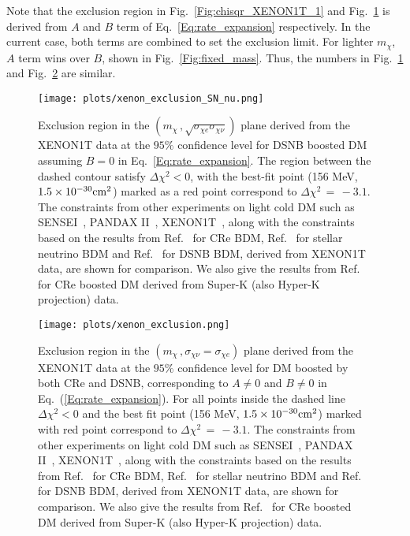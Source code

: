 \documentclass[11pt,prd,twocolumn,nofootinbib,reprint,superscriptaddress,longbibliography,colorlinks=true,citecolor=blue]{revtex4-1}
\begin{document}
Note that the exclusion region in Fig.~\ref{Fig:chisqr_XENON1T_1} and Fig.~\ref{Fig:chisqr_XENON1T_12} is derived from $A$ and $B$ term of Eq.~\ref{Eq:rate_expansion} respectively. In the current case, both terms are combined to set the exclusion limit. For lighter $m_\chi$, $A$ term wins over $B$, shown in Fig.~\ref{Fig:fixed_mass}. Thus, the numbers in Fig.~\ref{Fig:chisqr_XENON1T_12} and Fig.~\ref{Fig:chisqr_XENON1T_2} are similar.
\begin{figure}[h!]
\centering
\texttt{[image: plots/xenon\_exclusion\_SN\_nu.png]}
\caption{Exclusion region in the $(m_\chi\,,\sqrt{\sigma_{\chi e}\sigma_{\chi\nu}})$ plane derived from the XENON1T data at the $95\%$ confidence level for DSNB boosted DM assuming $B = 0$ in Eq.~\ref{Eq:rate_expansion}. The region between the dashed contour satisfy $\Delta \chi^2 < 0 $, with the best-fit point (156 MeV, $1.5\times 10^{-30} {\rm cm^2}$) marked as a red point correspond to $\Delta \chi^2\,=\, -3.1$. 
 The constraints from other experiments on light cold DM such as SENSEI~\cite{SENSEI:2020dpa}, PANDAX II~\cite{PandaX-II:2021nsg}, XENON1T~\cite{XENON:2019gfn}, along with the constraints based on the results from Ref.~\cite{Jho:2020sku} for CRe BDM, Ref.~\cite{Jho:2021rmn} for stellar neutrino BDM and Ref.~\cite{Das:2021lcr} for DSNB BDM, derived from XENON1T data, are shown for comparison. We also give the results from Ref.~\cite{Cappiello:2019qsw} for CRe boosted DM derived from Super-K (also Hyper-K projection) data.  }
\protect\label{Fig:chisqr_XENON1T_12}
\end{figure}


\begin{figure}
\centering
\texttt{[image: plots/xenon\_exclusion.png]}\hfill
\caption{Exclusion region in the $(m_\chi\,,\sigma_{\chi \nu} = \sigma_{\chi e})$ plane derived from the XENON1T data at the $95\%$ confidence level for DM boosted by both CRe and DSNB, corresponding to $A \neq 0$ and $B \neq 0$ in Eq.~(\ref{Eq:rate_expansion}). For all points inside the dashed line $\Delta \chi^2 < 0 $ and the best fit point (156 MeV, $1.5\times 10^{-30} {\rm cm^2}$) marked with red point correspond to $\Delta \chi^2\,=\,-3.1$.  The constraints from other experiments on light cold DM such as SENSEI~\cite{SENSEI:2020dpa}, PANDAX II~\cite{PandaX-II:2021nsg}, XENON1T~\cite{XENON:2019gfn}, along with the constraints based on the results from Ref.~\cite{Jho:2020sku} for CRe BDM, Ref.~\cite{Jho:2021rmn} for stellar neutrino BDM and Ref.~\cite{Das:2021lcr} for DSNB BDM, derived from XENON1T data, are shown for comparison. We also give the results from Ref.~\cite{Cappiello:2019qsw} for CRe boosted DM derived from Super-K (also Hyper-K projection) data. }
\protect\label{Fig:chisqr_XENON1T_2}
\end{figure}
\end{document}
